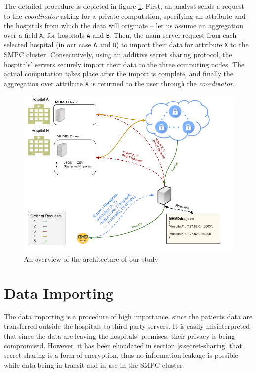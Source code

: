 The detailed procedure is depicted in figure \ref{f:overview}.
First, an analyst sends a request to the \textit{coordinator} asking for a private computation, specifying an attribute and the hospitals from which the data will originate -- let us assume an aggregation over a field \texttt{X}, for hospitals \texttt{A} and \texttt{B}.
Then, the main server request from each selected hospital (in our case \texttt{A} and \texttt{B}) to import their data for attribute \texttt{X} to the SMPC cluster.
Consecutively, using an additive secret sharing protocol, the hospitals' servers securely import their data to the three computing nodes.
The actual computation takes place after the import is complete, and finally the aggregation over attribute \texttt{X} is returned to the user through the \textit{coordinator}.




\begin{figure}[th]
  \centering
  \includegraphics[width=\linewidth]{figures/overview.png}
  \caption{An overview of the architecture of our study }\label{f:overview}
\end{figure}



\section{Data Importing}\label{s:importing}
The data importing is a procedure of high importance, since the patients data are transferred outside the hospitals to third party servers.
It is easily misinterpreted that since the data are leaving the hospitals' premises, their privacy is being compromised.
However, it has been elucidated in section \ref{s:secret-sharing} that secret sharing is a form of encryption, thus no information leakage is possible while data being in transit and in use in the SMPC cluster.



